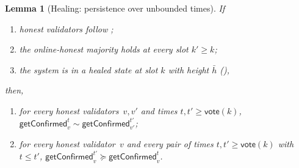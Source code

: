 \ifx\litemode\undefined\documentclass{article}\fi
\newcommand{\vote}{\mathsf{vote}}
\newcommand{\comm}[1]{\bar{#1}}
\newcommand{\getConfirmed}{\textsf{getConfirmed}\xspace}
\theoremstyle{plain}
\newtheorem{lemma}{Lemma}
\theoremstyle{definition}
\theoremstyle{remark}
\newcommand{\OHM}{online-honest majority\xspace}
\begin{document}
\begin{lemma}[Healing: persistence over unbounded times]\label{rev:lem:healing-unbounded}
If
\begin{enumerate}
  \item honest validators follow ;
  \item the \OHM holds at every slot $k' \geq k$;
  \item the system is in a healed state at slot $k$ with height $\comm{h}$ (),
\end{enumerate}
then,
\begin{enumerate}
  \item for every honest validators~$v,v'$ and times $t, t' \geq \vote(k)$, $\getConfirmed_v^{t} \sim \getConfirmed_{v'}^{t'}$;
  \item for every honest validator~$v$ and every pair of times $t, t' \geq \vote(k)$ with $t \leq t'$, $\getConfirmed_v^{t'} \succeq \getConfirmed_v^t$.
\end{enumerate}
\end{lemma}
\end{document}

